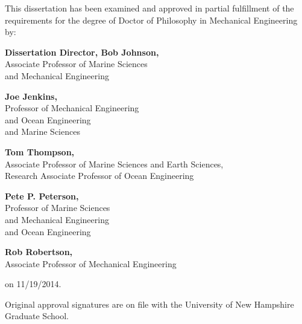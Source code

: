\newpage
\vspace*{0.75 in}

\begin{singlespace}


\noindent \small{This dissertation has been examined and approved in partial fulfillment of the requirements for the degree of Doctor of Philosophy in Mechanical Engineering by:}
\vspace{0.5in}

\hfill                                      %
\parbox{4in} {                               %
\textbf{Dissertation Director, Bob Johnson,}\\ \small{Associate Professor of Marine Sciences\\ and Mechanical Engineering}
\vspace{0.2in}

 {\textbf{Joe Jenkins,}\\ \small{Professor of Mechanical Engineering \\ and Ocean Engineering\\ and Marine Sciences}}
\vspace{0.2in}

 {\textbf{Tom Thompson,}\\   \small{Associate Professor of Marine Sciences and Earth Sciences,\\ Research Associate Professor of Ocean Engineering}}
\vspace{0.2in}

 {\textbf{Pete P. Peterson,}\\  \small {Professor of Marine Sciences\\ and Mechanical Engineering\\ and Ocean Engineering}}
\vspace{0.2in}

{\textbf{Rob Robertson,}\\   \small{Associate Professor of Mechanical
Engineering}}

\vspace{0.2in}
         on 11/19/2014.}


\vspace{0.5 in}
\noindent \small{Original approval signatures are on file with the University of New Hampshire Graduate School.}


\end{singlespace}
\vspace*{\fill}
